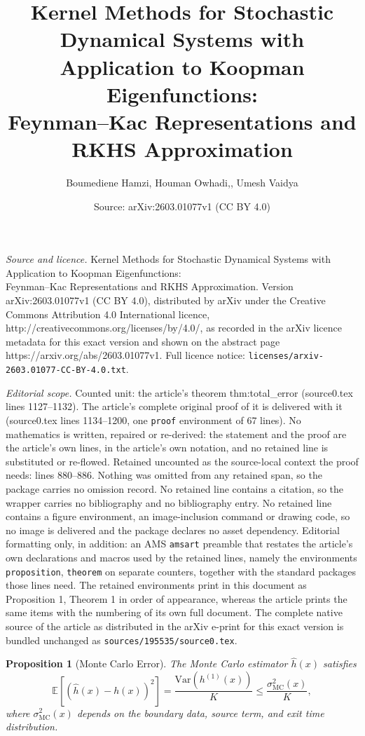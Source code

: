 \documentclass[10pt,a4paper]{amsart}
\title{\LARGE Kernel Methods for Stochastic Dynamical Systems with Application to Koopman Eigenfunctions:\\[0.5em] \large Feynman--Kac Representations and RKHS Approximation}
\author{Boumediene Hamzi, Houman Owhadi,, Umesh Vaidya}
\date{Source: arXiv:2603.01077v1 (CC BY 4.0)}
\newtheorem{proposition}{Proposition}
\newcommand{\E}{\mathbb{E}}
\newcommand{\Var}{\mathrm{Var}}
\begin{document}
\maketitle

\noindent\emph{Source and licence.} \LARGE Kernel Methods for Stochastic Dynamical Systems with Application to Koopman Eigenfunctions:\\[0.5em] \large Feynman--Kac Representations and RKHS Approximation. Version arXiv:2603.01077v1 (CC BY 4.0), distributed by arXiv under the Creative Commons Attribution 4.0 International licence, http://creativecommons.org/licenses/by/4.0/, as recorded in the arXiv licence metadata for this exact version and shown on the abstract page https://arxiv.org/abs/2603.01077v1. Full licence notice: \texttt{licenses/arxiv-2603.01077-CC-BY-4.0.txt}.\par\smallskip

\noindent\textit{Editorial scope.} Counted unit: the article's theorem thm:total\_error (source0.tex lines 1127--1132). The article's complete original proof of it is delivered with it (source0.tex lines 1134--1200, one \texttt{proof} environment of 67 lines). No mathematics is written, repaired or re-derived: the statement and the proof are the article's own lines, in the article's own notation, and no retained line is substituted or re-flowed.  Retained uncounted as the source-local context the proof needs: lines 880--886.  Nothing was omitted from any retained span, so the package carries no omission record.  No retained line contains a citation, so the wrapper carries no bibliography and no bibliography entry.  No retained line contains a figure environment, an image-inclusion command or drawing code, so no image is delivered and the package declares no asset dependency.  Editorial formatting only, in addition: an AMS \texttt{amsart} preamble that restates the article's own declarations and macros used by the retained lines, namely the environments \texttt{proposition}, \texttt{theorem} on separate counters, together with the standard packages those lines need.  The retained environments print in this document as Proposition 1, Theorem 1 in order of appearance, whereas the article prints the same items with the numbering of its own full document.  The complete native source of the article as distributed in the arXiv e-print for this exact version is bundled unchanged as \texttt{sources/195535/source0.tex}.
\begin{proposition}[Monte Carlo Error]\label{prop:mc_error}
The Monte Carlo estimator $\widehat{h}(x)$ satisfies
\begin{equation}
\E[(\widehat{h}(x) - h(x))^2] = \frac{\Var(h^{(1)}(x))}{K} \leq \frac{\sigma_{\mathrm{MC}}^2(x)}{K},
\end{equation}
where $\sigma_{\mathrm{MC}}^2(x)$ depends on the boundary data, source term, and exit time distribution.
\end{proposition}
\end{document}
